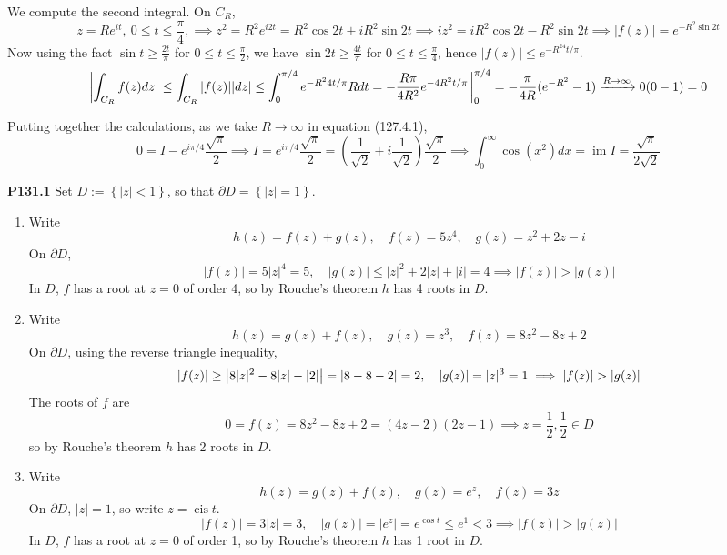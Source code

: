 \documentclass{article}
\def\tbf#1{\textbf{#1}}
\newcommand{\br}[1]{\left(#1\right)}
\newcommand{\brc}[1]{\left\{#1\right\}}
\DeclareMathOperator{\im}{im}
\newcommand{\imp}{\implies}
\newcommand{\sep}[1][.5cm]{\vspace{#1}}
\DeclareMathOperator{\cis}{cis}
\newcommand{\ptl}{\partial}
\begin{document}
We compute the second integral. On $C_R$,
$$z = Re^{it},~0\le t\le\frac\pi4,
\imp z^2 = R^2e^{i2t} = R^2\cos2t + iR^2\sin2t
\imp iz^2 = iR^2\cos2t - R^2\sin2t
\imp |f(z)| = e^{-R^2\sin2t}$$
Now using the fact $\sin t\ge\frac{2t}{\pi}$ for $0\le t\le\frac\pi2$, we have $\sin2t\ge\frac{4t}{\pi}$ for $0\le t\le\frac\pi4$, hence $|f(z)| \le e^{-R^24t/\pi}$.
$$\abs{\int_{C_R}f(z)dz} \le \int_{C_R}|f(z)||dz|
\le \int_0^{\pi/4}e^{-R^24t/\pi}Rdt
= -\frac{R\pi}{4R^2}e^{-4R^2t/\pi}\eval_0^{\pi/4}
= -\frac{\pi}{4R}(e^{-R^2}-1)
\app[R][\infty] 0(0-1)
= 0$$

Putting together the calculations, as we take $R\to\infty$ in equation (127.4.1),
$$0 = I - e^{i\pi/4}\frac{\sqrt\pi}{2}
\imp I = e^{i\pi/4}\frac{\sqrt\pi}{2} = \br{\frac{1}{\sqrt2} + i\frac{1}{\sqrt2}}\frac{\sqrt\pi}{2}
\imp \int_0^\infty \cos(x^2)dx = \im I = \frac{\sqrt\pi}{2\sqrt2}$$
\sep



\tbf{P131.1} Set $D:=\brc{|z|<1}$, so that $\ptl D=\brc{|z|=1}$.

\begin{enumerate}[label=(\roman*)]
	
\item Write
$$h(z) = f(z) + g(z),
\quad f(z) = 5z^4,
\quad g(z) = z^2 + 2z - i$$
On $\ptl D$,
$$|f(z)| = 5|z|^4 = 5,
\quad |g(z)| \le |z|^2 + 2|z| + |i| = 4
\imp |f(z)|>|g(z)|$$
In $D$, $f$ has a root at $z=0$ of order 4, so by Rouche's theorem $h$ has 4 roots in $D$.


\item Write
$$h(z) = g(z) + f(z),
\quad g(z) = z^3,
\quad f(z) = 8z^2 - 8z + 2$$
On $\ptl D$, using the reverse triangle inequality,
$$|f(z)| \ge \abs{8|z|^2 - 8|z| - |2|} = |8-8-2| = 2,
\quad |g(z)| = |z|^3 = 1
\imp |f(z)| > |g(z)|$$
The roots of $f$ are
$$0 = f(z) = 8z^2 - 8z + 2 = (4z-2)(2z-1)
\imp z=\frac12,\frac12 \in D$$
so by Rouche's theorem $h$ has 2 roots in $D$.


\item Write
$$h(z) = g(z) + f(z),
\quad g(z) = e^z,
\quad f(z) = 3z$$
On $\ptl D$, $|z|=1$, so write $z=\cis t$.
$$|f(z)| = 3|z| = 3,
\quad |g(z)| = |e^z| = e^{\cos t} \le e^1 < 3
\imp |f(z)| > |g(z)|$$
In $D$, $f$ has a root at $z=0$ of order 1, so by Rouche's theorem $h$ has 1 root in $D$.

\end{enumerate}
	
\end{document}
